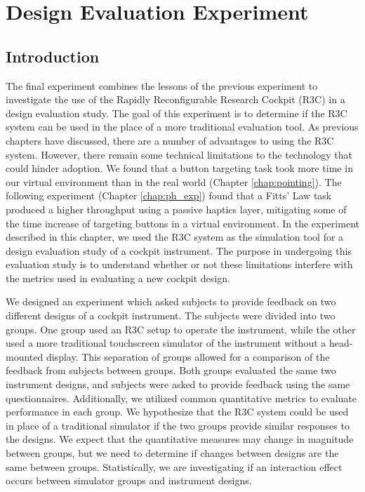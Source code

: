\chapter{Design Evaluation Experiment}
\label{chap:de_exp}

\section{Introduction}

The final experiment combines the lessons of the previous experiment to investigate the use of the Rapidly Reconfigurable Research Cockpit (R3C) in a design evaluation study.
The goal of this experiment is to determine if the R3C system can be used in the place of a more traditional evaluation tool.
As previous chapters have discussed, there are a number of advantages to using the R3C system.
However, there remain some technical limitations to the technology that could hinder adoption.
We found that a button targeting task took more time in our virtual environment than in the real world (Chapter \ref{chap:pointing}).
The following experiment (Chapter \ref{chap:ph_exp}) found that a Fitts' Law task produced a higher throughput using a passive haptics layer, mitigating some of the time increase of targeting buttons in a virtual environment.
In the experiment described in this chapter, we used the R3C system as the simulation tool for a design evaluation study of a cockpit instrument.
The purpose in undergoing this evaluation study is to understand whether or not these limitations interfere with the metrics used in evaluating a new cockpit design.

We designed an experiment which asked subjects to provide feedback on two different designs of a cockpit instrument.
The subjects were divided into two groups.
One group used an R3C setup to operate the instrument, while the other used a more traditional touchscreen simulator of the instrument without a head-mounted display.
This separation of groups allowed for a comparison of the feedback from subjects between groups.
Both groups evaluated the same two instrument designs, and subjects were asked to provide feedback using the same questionnaires.
Additionally, we utilized common quantitative metrics to evaluate performance in each group.
We hypothesize that the R3C system could be used in place of a traditional simulator if the two groups provide similar responses to the designs.
We expect that the quantitative measures may change in magnitude between groups, but we need to determine if changes between designs are the same between groups.
Statistically, we are investigating if an interaction effect occurs between simulator groups and instrument designs.

